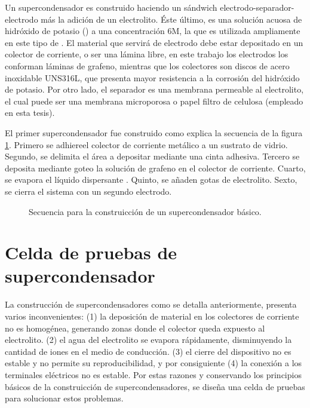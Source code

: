 Un supercondensador es construido haciendo un sándwich electrodo-separador-electrodo más la adición de un electrolito. Éste último, es una solución acuosa de hidróxido de potasio () a una concentración 6M, la que es utilizada ampliamente en este tipo de \citep{Frackowiak2001}.  El material que servirá de electrodo debe estar depositado en un colector de corriente, o ser una lámina libre, en este trabajo los electrodos los conforman láminas de grafeno, mientras que los colectores son discos de acero inoxidable UNS316L, que presenta mayor resistencia a la corrosión del hidróxido de potasio. Por otro lado, el separador es una membrana permeable al electrolito, el cual puede ser una membrana microporosa o papel filtro de celulosa (empleado en esta tesis).

El primer supercondensador fue construido como explica la secuencia de la figura \ref{fig:SC_process}. Primero se adhiereel colector de corriente metálico a un sustrato de vidrio. Segundo, se delimita el área a depositar mediante una cinta adhesiva. Tercero se deposita mediante goteo la solución de grafeno en el colector de corriente. Cuarto, se evapora el líquido dispersante . Quinto, se añaden gotas de electrolito. Sexto, se cierra el sistema con un segundo electrodo.

\begin{figure}[h!]
	\centering
	\caption{Secuencia para la construicción de un supercondensador básico.}
	\label{fig:SC_process}
\end{figure}

\section{Celda de pruebas de supercondensador}
La construcción de supercondensadores como se detalla anteriormente, presenta varios inconvenientes: (1) la deposición de material en los colectores de corriente no es homogénea, generando zonas donde el colector queda expuesto al electrolito. (2) el agua del electrolito se evapora rápidamente, disminuyendo la cantidad de iones en el medio de conducción. (3) el cierre del dispositivo no es estable y no permite su reproducibilidad, y por consiguiente (4) la conexión a los terminales eléctricos no es estable. Por estas razones y conservando los principios básicos de la construicción de supercondensadores, se diseña una celda de pruebas para solucionar estos problemas.

